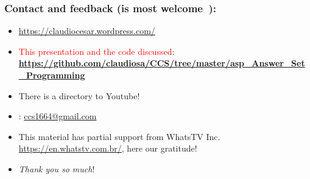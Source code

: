 \documentclass{beamer}
\begin{document}
\begin{frame}

\frametitle{Contact and feedback (is most welcome\ \Smiley):}
  
\begin{block}{}
  \begin{itemize}
  \item \url{https://claudiocesar.wordpress.com/}
   \item \textcolor{red}{This presentation and the code discussed}:\\
   \textbf{\textcolor{blue}{\url{https://github.com/claudiosa/CCS/tree/master/asp_Answer_Set_Programming}}}
   \item There is a directory to Youtube!
    
  \item \Letter: \url{ccs1664@gmail.com}
  \item This material has partial support from WhatsTV Inc. \url{https://en.whatstv.com.br/}, here our gratitude!
  \item \textit{Thank you so much}!

  \end{itemize}
  \end{block}

\end{frame}


\end{document}
